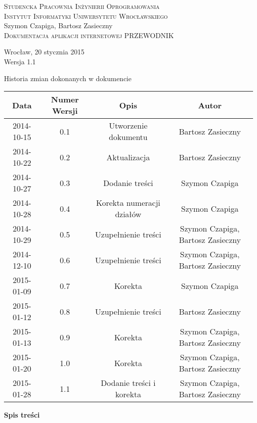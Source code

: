 \documentclass[12pt,a4paper]{report}
\makeatletter
\newcommand*{\toccontents}{\@starttoc{toc}}
\makeatother
\begin{document}
\newcommand{\itab}[1]{\hspace{4em}\rlap{#1}}
\newcommand{\tab}[1]{\hspace{.2\textwidth}\rlap{#1}}

\begin{titlepage}
\begin{center}
\textsc{Studencka Pracownia Inżynierii Oprogramowania}\\[0.5cm]
\textsc{Instytut Informatyki Uniwersytetu Wrocławskiego}\\[8.0cm]

Szymon Czapiga, Bartosz Zasieczny\\[1.0cm]

\LARGE{\textsc{Dokumentacja aplikacji internetowej PRZEWODNIK}}\\[8.5cm]

\begin{normalsize}

Wrocław, 20 stycznia 2015\\[0.5cm]
Wersja 1.1
\end{normalsize}
\end{center}
\end{titlepage}
\setcounter{page}{3}
\begin{table}[h1]
 \itab \textit{Tabela 0.} Historia zmian dokonanych w dokumencie
  \begin{center}
    \begin{tabular}{| c | c | c | c |}
    \hline
    Data & Numer Wersji & Opis & Autor \\
    \hline \hline
    2014-10-15 & 0.1 & Utworzenie dokumentu & Bartosz Zasieczny \\
    \hline
    2014-10-22 & 0.2 & Aktualizacja & Bartosz Zasieczny \\
    \hline
    2014-10-27 & 0.3 & Dodanie treści  & Szymon Czapiga \\
    \hline
    2014-10-28 & 0.4 & Korekta numeracji działów & Szymon Czapiga \\
    \hline
    2014-10-29 & 0.5 & Uzupełnienie treści & Szymon Czapiga, Bartosz Zasieczny \\
    \hline
    2014-12-10 & 0.6 & Uzupełnienie treści & Szymon Czapiga, Bartosz Zasieczny \\
    \hline
    2015-01-09 & 0.7 & Korekta & Szymon Czapiga\\
    \hline
    2015-01-12 & 0.8 & Uzupełnienie treści & Bartosz Zasieczny \\
    \hline
    2015-01-13 & 0.9 & Korekta & Szymon Czapiga, Bartosz Zasieczny \\
    \hline
    2015-01-20 & 1.0 & Korekta & Szymon Czapiga, Bartosz Zasieczny \\
    \hline
    2015-01-28 & 1.1 & Dodanie treści i korekta & Szymon Czapiga, Bartosz Zasieczny \\
    \hline
    \end{tabular}
  \end{center}
\end{table}
\textbf{\large{Spis treści}}\\[0.3cm]
\toccontents
\newpage
\end{document}
